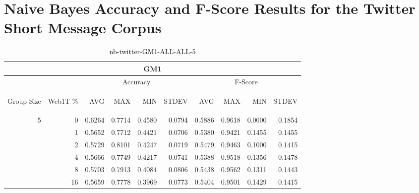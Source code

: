 \chapter{Naive Bayes Accuracy and F-Score Results for the Twitter Short Message Corpus}

\begin{center}
\begin{table}[htbp]
\begin{center}
\begin{tabular}{ | r | r | r | r | r | r | r | r | r | r |}
\hline
\multicolumn{10}{|c|}{GM1}\\
\hline
 & & \multicolumn{4}{|c|}{Accuracy} & \multicolumn{4}{|c|}{F-Score}\\ \cline{3-10}
\begin{sideways}Group Size\end{sideways} & \begin{sideways}Web1T \%\end{sideways} & \begin{sideways}AVG\end{sideways} & \begin{sideways}MAX\end{sideways} & \begin{sideways}MIN\end{sideways} & \begin{sideways}STDEV\end{sideways} & \begin{sideways}AVG\end{sideways} & \begin{sideways}MAX\end{sideways} & \begin{sideways}MIN\end{sideways} & \begin{sideways}STDEV\end{sideways}\\
\hline
\multirow{5}{*}{5}
 & 0 & 0.6264 & 0.7714 & 0.4580 & 0.0794 & 0.5886 & 0.9618 & 0.0000 & 0.1854\\ \cline{2-10}
 & 1 & 0.5652 & 0.7712 & 0.4421 & 0.0706 & 0.5380 & 0.9421 & 0.1455 & 0.1455\\ \cline{2-10}
 & 2 & 0.5729 & 0.8101 & 0.4247 & 0.0719 & 0.5479 & 0.9463 & 0.1000 & 0.1415\\ \cline{2-10}
 & 4 & 0.5666 & 0.7749 & 0.4217 & 0.0741 & 0.5388 & 0.9518 & 0.1356 & 0.1478\\ \cline{2-10}
 & 8 & 0.5703 & 0.7913 & 0.4084 & 0.0806 & 0.5438 & 0.9562 & 0.1311 & 0.1443\\ \cline{2-10}
 & 16 & 0.5659 & 0.7778 & 0.3969 & 0.0773 & 0.5404 & 0.9501 & 0.1429 & 0.1415\\ \cline{2-10}
\hline
\end{tabular}
\caption{nb-twitter-GM1-ALL-ALL-5}
\label{table:nb-twitter-GM1-ALL-ALL-5}
\end{center}
\end{table}
\end{center}


